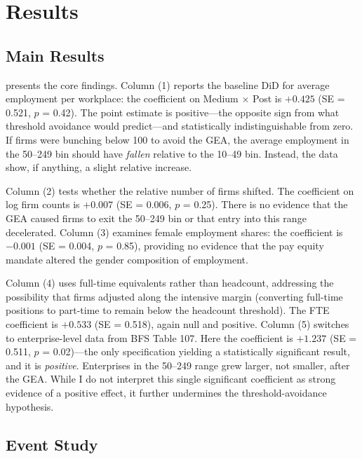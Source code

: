 \documentclass[12pt]{article}
\begin{document}
\section{Results}

\subsection{Main Results}

 presents the core findings. Column (1) reports the baseline DiD for average employment per workplace: the coefficient on Medium $\times$ Post is $+0.425$ (SE = 0.521, $p$ = 0.42). The point estimate is positive---the opposite sign from what threshold avoidance would predict---and statistically indistinguishable from zero. If firms were bunching below 100 to avoid the GEA, the average employment in the 50--249 bin should have \emph{fallen} relative to the 10--49 bin. Instead, the data show, if anything, a slight relative increase.

Column (2) tests whether the relative number of firms shifted. The coefficient on log firm counts is $+0.007$ (SE = 0.006, $p$ = 0.25). There is no evidence that the GEA caused firms to exit the 50--249 bin or that entry into this range decelerated. Column (3) examines female employment shares: the coefficient is $-0.001$ (SE = 0.004, $p$ = 0.85), providing no evidence that the pay equity mandate altered the gender composition of employment.

Column (4) uses full-time equivalents rather than headcount, addressing the possibility that firms adjusted along the intensive margin (converting full-time positions to part-time to remain below the headcount threshold). The FTE coefficient is $+0.533$ (SE = 0.518), again null and positive. Column (5) switches to enterprise-level data from BFS Table 107. Here the coefficient is $+1.237$ (SE = 0.511, $p$ = 0.02)---the only specification yielding a statistically significant result, and it is \emph{positive}. Enterprises in the 50--249 range grew larger, not smaller, after the GEA. While I do not interpret this single significant coefficient as strong evidence of a positive effect, it further undermines the threshold-avoidance hypothesis.



\subsection{Event Study}
\end{document}
